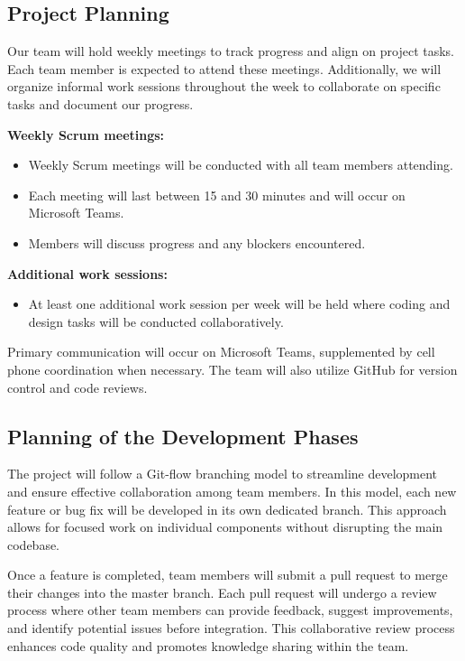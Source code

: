\documentclass{article}
\begin{document}
\subsection{Project Planning}
Our team will hold weekly meetings to track progress and align on project tasks. Each team member is expected to attend these meetings. Additionally, we will organize informal work sessions throughout the week to collaborate on specific tasks and document our progress.

\textbf{Weekly Scrum meetings:}
\begin{itemize}
    \item Weekly Scrum meetings will be conducted with all team members attending.
    \item Each meeting will last between 15 and 30 minutes and will occur on Microsoft Teams.
    \item Members will discuss progress and any blockers encountered.
\end{itemize}

\textbf{Additional work sessions:}
\begin{itemize}
    \item At least one additional work session per week will be held where coding and design tasks will be conducted collaboratively.
\end{itemize}

Primary communication will occur on Microsoft Teams, supplemented by cell phone coordination when necessary. The team will also utilize GitHub for version control and code reviews.

\subsection{Planning of the Development Phases}
The project will follow a Git-flow branching model to streamline development and ensure effective collaboration among team members. In this model, each new feature or bug fix will be developed in its own dedicated branch. This approach allows for focused work on individual components without disrupting the main codebase.

Once a feature is completed, team members will submit a pull request to merge their changes into the master branch. Each pull request will undergo a review process where other team members can provide feedback, suggest improvements, and identify potential issues before integration. This collaborative review process enhances code quality and promotes knowledge sharing within the team.
\end{document}
